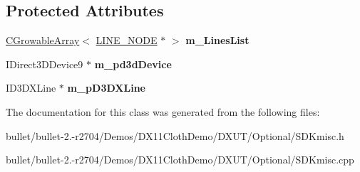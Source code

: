 \subsection*{Protected Attributes}
\begin{DoxyCompactItemize}
\item 
\hypertarget{class_c_d_x_u_t_line_manager_a529b6d8c2c733005bb6114809b70b58a}{\hyperlink{class_c_growable_array}{C\+Growable\+Array}$<$ \hyperlink{struct_c_d_x_u_t_line_manager_1_1_l_i_n_e___n_o_d_e}{L\+I\+N\+E\+\_\+\+N\+O\+D\+E} $\ast$ $>$ {\bfseries m\+\_\+\+Lines\+List}}\label{class_c_d_x_u_t_line_manager_a529b6d8c2c733005bb6114809b70b58a}

\item 
\hypertarget{class_c_d_x_u_t_line_manager_a14112175096fd07b59058fed2a83ae6d}{I\+Direct3\+D\+Device9 $\ast$ {\bfseries m\+\_\+pd3d\+Device}}\label{class_c_d_x_u_t_line_manager_a14112175096fd07b59058fed2a83ae6d}

\item 
\hypertarget{class_c_d_x_u_t_line_manager_a34d87cec39b6a73c9f3dc3608859892a}{I\+D3\+D\+X\+Line $\ast$ {\bfseries m\+\_\+p\+D3\+D\+X\+Line}}\label{class_c_d_x_u_t_line_manager_a34d87cec39b6a73c9f3dc3608859892a}

\end{DoxyCompactItemize}


The documentation for this class was generated from the following files\+:\begin{DoxyCompactItemize}
\item 
bullet/bullet-\/2.-\/r2704/\+Demos/\+D\+X11\+Cloth\+Demo/\+D\+X\+U\+T/\+Optional/S\+D\+Kmisc.\+h\item 
bullet/bullet-\/2.-\/r2704/\+Demos/\+D\+X11\+Cloth\+Demo/\+D\+X\+U\+T/\+Optional/S\+D\+Kmisc.\+cpp\end{DoxyCompactItemize}
